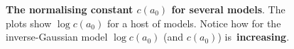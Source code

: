 \documentclass[a4paper, notitlepage, 11pt]{article}
\begin{document}
\begin{figure}
\hfill
{}
\caption{\textbf{The normalising constant $c(a_0)$ for several models}.
The plots show $\log c(a_0)$ for a host of models.
Notice how for the inverse-Gaussian model  $\log c(a_0)$ (and $c(a_0)$) is~\textbf{increasing}.
}
\label{fig:cA0}
\end{figure}
\end{document}
